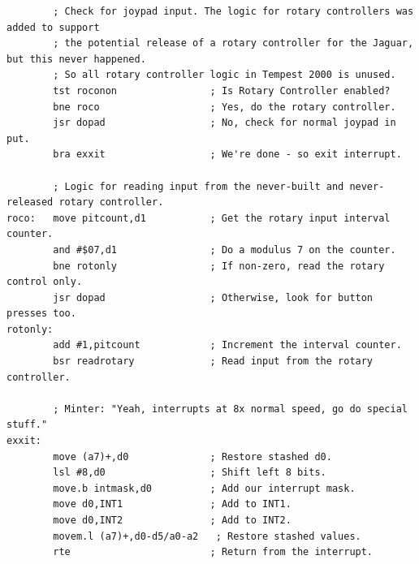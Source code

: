 \begin{lstlisting}
        ; Check for joypad input. The logic for rotary controllers was added to support
        ; the potential release of a rotary controller for the Jaguar, but this never happened.
        ; So all rotary controller logic in Tempest 2000 is unused.
        tst roconon                ; Is Rotary Controller enabled?
        bne roco                   ; Yes, do the rotary controller.
        jsr dopad                  ; No, check for normal joypad in put.
        bra exxit                  ; We're done - so exit interrupt.
    
        ; Logic for reading input from the never-built and never-released rotary controller.
roco:   move pitcount,d1           ; Get the rotary input interval counter.
        and #$07,d1                ; Do a modulus 7 on the counter.
        bne rotonly                ; If non-zero, read the rotary control only.
        jsr dopad                  ; Otherwise, look for button presses too.
rotonly:
        add #1,pitcount            ; Increment the interval counter.
        bsr readrotary             ; Read input from the rotary controller.
    
        ; Minter: "Yeah, interrupts at 8x normal speed, go do special stuff."
exxit:
        move (a7)+,d0              ; Restore stashed d0.
        lsl #8,d0                  ; Shift left 8 bits.
        move.b intmask,d0          ; Add our interrupt mask.
        move d0,INT1               ; Add to INT1.
        move d0,INT2               ; Add to INT2.
        movem.l (a7)+,d0-d5/a0-a2   ; Restore stashed values.
        rte                        ; Return from the interrupt.
\end{lstlisting}
